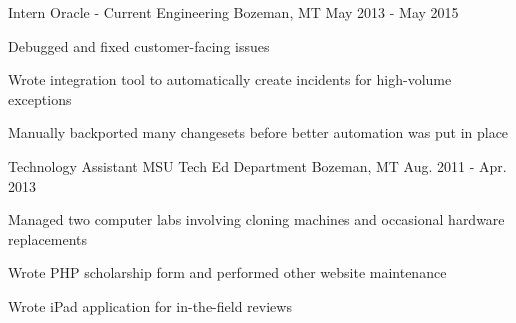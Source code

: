 \begin{cventries}
  \cventry
    {Intern} %
    {Oracle - Current Engineering} %
    {Bozeman, MT} %
    {May 2013 - May 2015} %
    {
      \begin{cvitems} %
        \item {Debugged and fixed customer-facing issues}
        \item {Wrote integration tool to automatically create incidents for high-volume exceptions}
        \item {Manually backported many changesets before better automation was put in place}
      \end{cvitems}
    }

  \cventry
    {Technology Assistant} %
    {MSU Tech Ed Department} %
    {Bozeman, MT} %
    {Aug. 2011 - Apr. 2013} %
    {
      \begin{cvitems} %
        \item {Managed two computer labs involving cloning machines and occasional hardware replacements}
        \item {Wrote PHP scholarship form and performed other website maintenance}
        \item {Wrote iPad application for in-the-field reviews}
      \end{cvitems}
    }

\end{cventries}
